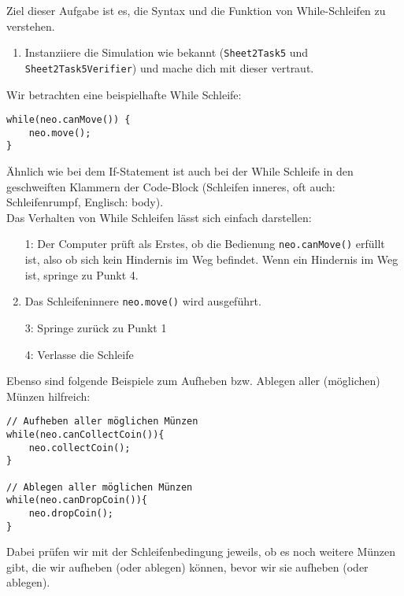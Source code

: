 

Ziel dieser Aufgabe ist es, die Syntax und die Funktion von While-Schleifen zu verstehen.

\begin{enumerate}
    \item Instanziiere die Simulation wie bekannt (\lstinline{Sheet2Task5} und \lstinline{Sheet2Task5Verifier}) und mache dich mit dieser vertraut.
\end{enumerate}


\begin{Infobox}
    Wir betrachten eine beispielhafte While Schleife:

    \begin{lstlisting}[breaklines=true, numbers=none]
while(neo.canMove()) {
    neo.move();
}
    \end{lstlisting}

    Ähnlich wie bei dem If-Statement ist auch bei der While Schleife in den geschweiften Klammern der Code-Block (Schleifen inneres, oft auch: Schleifenrumpf, Englisch: body).\\

    Das Verhalten von While Schleifen lässt sich einfach darstellen:
    \begin{enumerate}
        \item[1:] Der Computer prüft als Erstes, ob die Bedienung \lstinline{neo.canMove()} erfüllt ist, also ob sich kein Hindernis im Weg befindet. Wenn ein Hindernis im Weg ist, springe zu Punkt 4.
        \item[2:] Das Schleifeninnere \lstinline{neo.move()} wird ausgeführt.
        \item[3:] Springe zurück zu Punkt 1
        \item[4:] Verlasse die Schleife
    \end{enumerate}

    Ebenso sind folgende Beispiele zum Aufheben bzw. Ablegen aller (möglichen) Münzen hilfreich:

    \begin{lstlisting}[breaklines=true, numbers=none]
// Aufheben aller möglichen Münzen
while(neo.canCollectCoin()){
    neo.collectCoin();
}

// Ablegen aller möglichen Münzen
while(neo.canDropCoin()){
    neo.dropCoin();
}
    \end{lstlisting}

    Dabei prüfen wir mit der Schleifenbedingung jeweils, ob es noch weitere Münzen gibt, die wir aufheben (oder ablegen) können, bevor wir sie aufheben (oder ablegen).
\end{Infobox}


